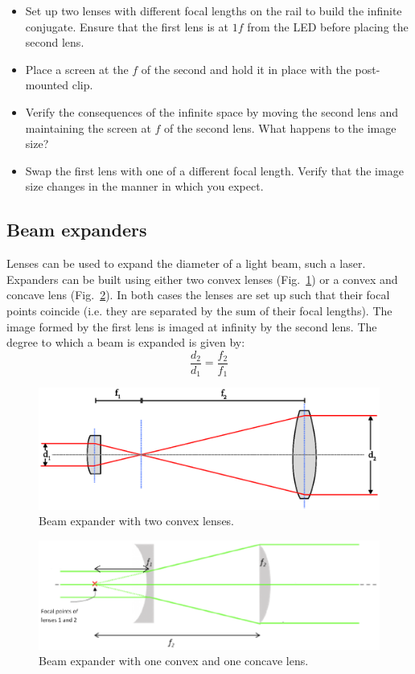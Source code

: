 \documentclass[a4paper]{report}
\begin{document}
\begin{itemize}
\item Set up two lenses with different focal lengths on the rail to build the infinite conjugate. 
Ensure that the first lens is at $1f$ from the LED before placing the second lens. 
\item Place a screen at the $f$ of the second and hold it in place with the post-mounted clip.
\item Verify the consequences of the infinite space by moving the second lens and maintaining the screen at $f$ of the second lens. 
What happens to the image size?
\item Swap the first lens with one of a different focal length. 
Verify that the image size changes in the manner in which you expect. 
\end{itemize}



\clearpage


\subsection{Beam expanders}
Lenses can be used to expand the diameter of a light beam, such a laser.
Expanders can be built using either two convex lenses (Fig.~\ref{beamExpander1}) or a convex and concave lens (Fig.~\ref{beamExpander2}). 
In both cases the lenses are set up such that their focal points coincide (i.e. they are separated by the sum of their focal lengths). 
The image formed by the first lens is imaged at infinity by the second lens.
The degree to which a beam is expanded is given by:
\begin{equation}
\frac{d_2}{d_1}=\frac{f_2}{f_1}
\label{eq:beamExp}
\end{equation}

\begin{figure}[h]
\center
\includegraphics[width=4.5in]{beamExpander1.eps}
\caption{Beam expander with two convex lenses.}
\label{beamExpander1}
\end{figure}

\begin{figure}[h]
\center
\includegraphics[width=4.5in]{beamExpander2.eps}
\caption{Beam expander with one convex and one concave lens.}
\label{beamExpander2}
\end{figure}
\end{document}
